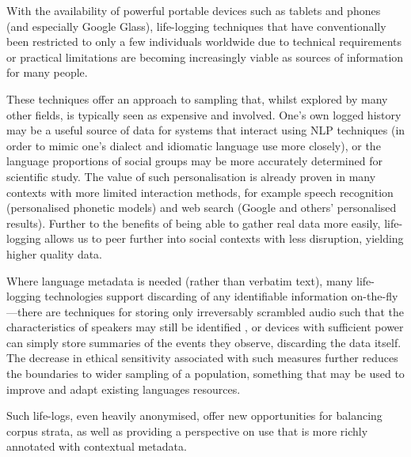 With the availability of powerful portable devices such as tablets and phones (and especially Google Glass), life-logging techniques that have conventionally been restricted to only a few individuals worldwide due to technical requirements or practical limitations are becoming increasingly viable as sources of information for many people.

These techniques offer an approach to sampling that, whilst explored by many other fields, is typically seen as expensive and involved.  One's own logged history may be a useful source of data for systems that interact using NLP techniques (in order to mimic one's dialect and idiomatic language use more closely), or the language proportions of social groups may be more accurately determined for scientific study.  The value of such personalisation is already proven in many contexts with more limited interaction methods, for example speech recognition (personalised phonetic models) and web search (Google and others' personalised results).  Further to the benefits of being able to gather real data more easily, life-logging allows us to peer further into social contexts with less disruption, yielding higher quality data.

Where language metadata is needed (rather than verbatim text), many life-logging technologies support discarding of any identifiable information on-the-fly---there are techniques for storing only irreversably scrambled audio such that the characteristics of speakers may still be identified
\cite{lee2006voice}, or devices with sufficient power can simply store summaries of the events they observe, discarding the data itself.
The decrease in ethical sensitivity associated with such measures further reduces the boundaries to wider sampling of a population, something that may be used to improve and adapt existing languages resources.



Such life-logs, even heavily anonymised, offer new opportunities for balancing corpus strata, as well as providing a perspective on use that is more richly annotated with contextual metadata.





